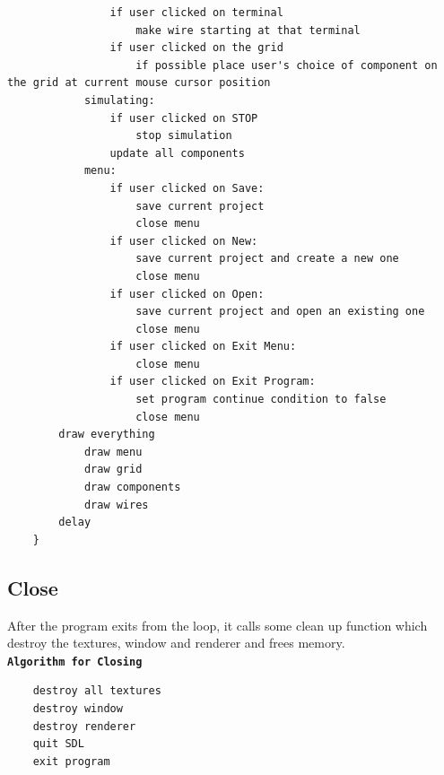 \documentclass[report]{subfiles}
\begin{document}
\begin{verbatim}
                if user clicked on terminal
                    make wire starting at that terminal
                if user clicked on the grid
                    if possible place user's choice of component on the grid at current mouse cursor position
            simulating:
                if user clicked on STOP
                    stop simulation
                update all components
            menu:
                if user clicked on Save:
                    save current project
                    close menu
                if user clicked on New:
                    save current project and create a new one
                    close menu
                if user clicked on Open:
                    save current project and open an existing one
                    close menu
                if user clicked on Exit Menu:
                    close menu
                if user clicked on Exit Program:
                    set program continue condition to false 
                    close menu
        draw everything
            draw menu
            draw grid
            draw components
            draw wires
        delay
    }
        \end{verbatim}
    \subsection{Close}
    After the program exits from the loop, it calls some clean up function which destroy the textures, window and renderer and frees memory.\\
        \textbf{\texttt{Algorithm for Closing}}
        \begin{verbatim}
    destroy all textures
    destroy window
    destroy renderer
    quit SDL
    exit program
        \end{verbatim}
\end{document}
